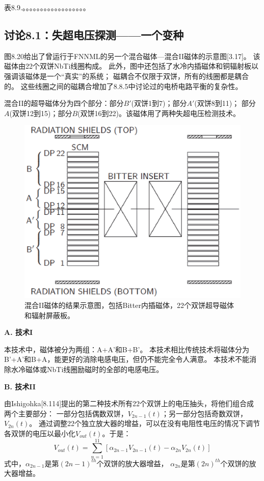 表8.9.。。。。。。。。。。。。。。。。。。


\subsection{讨论8.1：失超电压探测——一个变种}
图8.20给出了曾运行于FNNML的另一个混合磁体---混合II磁体的示意图[3.17]。
该磁体由22个双饼NbTi线圈构成。
此外，图中还包括了水冷内插磁体和铜辐射板以强调该磁体是一个“真实”的系统；
磁耦合不仅限于双饼，所有的线圈都是耦合的。
这些线圈之间的磁耦合增加了8.8.5中讨论过的电桥电路平衡的复杂性。

混合II的超导磁体分为四个部分：部分$B'$(双饼1到7)；部分$A'$(双饼8到11)；
部分$A$(双饼12到15)；部分$B$(双饼16到22)。该磁体用了两种失超电压检测技术。

\begin{figure}
	\centering
	\includegraphics[scale=0.6]{chpt8/figs/fig8.20.eps}
	\caption{混合II磁体的结果示意图，包括Bitter内插磁体，22个双饼超导磁体和辐射屏蔽板。}
\end{figure}

\textbf{A. 技术I}

本技术中，磁体被分为两组：A+A'和B+B'。
本技术相比传统技术将磁体分为B'+A'和B+A，能更好的消除电感电压，但仍不能完全令人满意。
本技术不能消除水冷磁体或NbTi线圈励磁时的全部的电感电压。

\textbf{B. 技术II}

由Ishigohka[8.114]提出的第二种技术所有22个双饼上的电压抽头，将他们组合成两个主要部分：
一部分包括偶数双饼，$V_{2n-1}(t)$；另一部分包括奇数双饼，$V_{2n}(t)$。
通过调整22个独立放大器的增益，可以在没有电阻性电压的情况下调节各双饼的电压以最小化$V_{out}(t)$。于是：
\begin{equation}%
V_{out}(t)=\sum_{n=1}^{11}[\alpha_{2n-1}V_{2n-1}(t)-\alpha_{2n}V_{2n}(t)]
\end{equation}
式中，$\alpha_{2n-1}$是第$(2n-1)^{th}$个双饼的放大器增益，
$\alpha_{2n}$是第$(2n)^{th}$个双饼的放大器增益。


